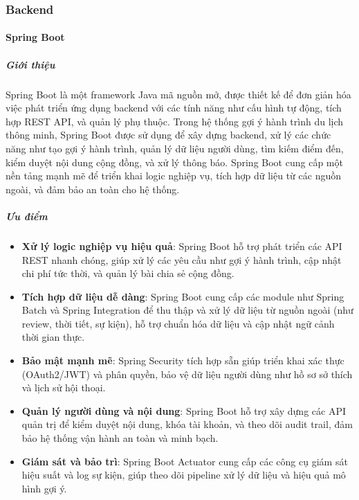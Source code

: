 \subsubsection{Backend}
\paragraph{Spring Boot}

\subparagraph{Giới thiệu}
Spring Boot là một framework Java mã nguồn mở, được thiết kế để đơn giản hóa việc phát triển ứng dụng backend với các tính năng như cấu hình tự động, tích hợp REST API, và quản lý phụ thuộc. Trong hệ thống gợi ý hành trình du lịch thông minh, Spring Boot được sử dụng để xây dựng backend, xử lý các chức năng như tạo gợi ý hành trình, quản lý dữ liệu người dùng, tìm kiếm điểm đến, kiểm duyệt nội dung cộng đồng, và xử lý thông báo. Spring Boot cung cấp một nền tảng mạnh mẽ để triển khai logic nghiệp vụ, tích hợp dữ liệu từ các nguồn ngoài, và đảm bảo an toàn cho hệ thống.

\subparagraph{Ưu điểm}
\begin{itemize}
    \item \textbf{Xử lý logic nghiệp vụ hiệu quả}: Spring Boot hỗ trợ phát triển các API REST nhanh chóng, giúp xử lý các yêu cầu như gợi ý hành trình, cập nhật chi phí tức thời, và quản lý bài chia sẻ cộng đồng.
    \item \textbf{Tích hợp dữ liệu dễ dàng}: Spring Boot cung cấp các module như Spring Batch và Spring Integration để thu thập và xử lý dữ liệu từ nguồn ngoài (như review, thời tiết, sự kiện), hỗ trợ chuẩn hóa dữ liệu và cập nhật ngữ cảnh thời gian thực.
    \item \textbf{Bảo mật mạnh mẽ}: Spring Security tích hợp sẵn giúp triển khai xác thực (OAuth2/JWT) và phân quyền, bảo vệ dữ liệu người dùng như hồ sơ sở thích và lịch sử hội thoại.
    \item \textbf{Quản lý người dùng và nội dung}: Spring Boot hỗ trợ xây dựng các API quản trị để kiểm duyệt nội dung, khóa tài khoản, và theo dõi audit trail, đảm bảo hệ thống vận hành an toàn và minh bạch.
    \item \textbf{Giám sát và bảo trì}: Spring Boot Actuator cung cấp các công cụ giám sát hiệu suất và log sự kiện, giúp theo dõi pipeline xử lý dữ liệu và hiệu quả mô hình gợi ý.
\end{itemize}


